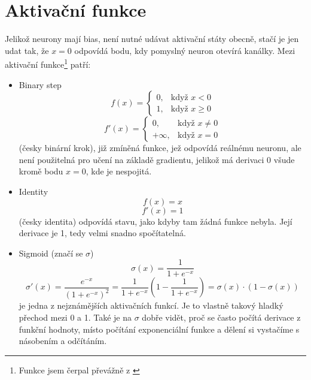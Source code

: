 \documentclass[12pt]{report}			%
\begin{document}
				\section{Aktivační funkce} \label{s:af}
				Jelikož neurony mají bias, není nutné udávat aktivační státy obecně, stačí je jen udat tak, že $x=0$ odpovídá bodu, kdy pomyslný  neuron otevírá kanálky. Mezi aktivační funkce\footnote{Funkce jsem čerpal převážně z \autocite{wiki:ActivationFunctions}} patří:
				\begin{itemize}
					\item Binary step 
						\begin{equation}f(x) = \begin{cases}0, & \text{když } x < 0\\1, & \text{když } x \geq 0 \end{cases}\end{equation}
						\begin{equation}f'(x) = \begin{cases}0, & \text{když } x \neq 0\\\mathrm{+\infty}, & \text{když } x = 0 \end{cases}\end{equation}
						(česky binární krok), již zmíněná funkce, jež odpovídá reálnému neuronu, ale není použitelná pro učení na základě gradientu, jelikož má derivaci 0 všude kromě bodu $x = 0$, kde je nespojitá.
					\item Identity 
						\begin{equation}f(x) = x\end{equation}
						\begin{equation}f'(x) = 1 \end{equation}
						(česky identita) odpovídá stavu, jako kdyby tam žádná funkce nebyla. Její derivace je 1, tedy velmi snadno spočítatelná.
					\item Sigmoid (značí se $\sigma$)
						\begin{equation}\sigma(x) = \frac{1}{1+e^{-x}}\end{equation}										
						\begin{equation}\sigma'(x) = \frac{e^{-x}}{\left(1+e^{-x}\right)^2} = \frac{1}{1+e^{-x}}\left(1-\frac{1}{1+e^{-x}}\right) = \sigma(x)\cdot\left(1-\sigma(x)\right)\end{equation}										
						je jedna z nejznámějších aktivačních funkcí. Je to vlastně takový hladký přechod mezi 0 a 1. Také je na $\sigma$ dobře vidět, proč se často počítá derivace z funkční hodnoty, místo počítání exponenciální funkce a dělení si vystačíme s násobením a odčítáním.
						

\end{itemize}
\end{document}
